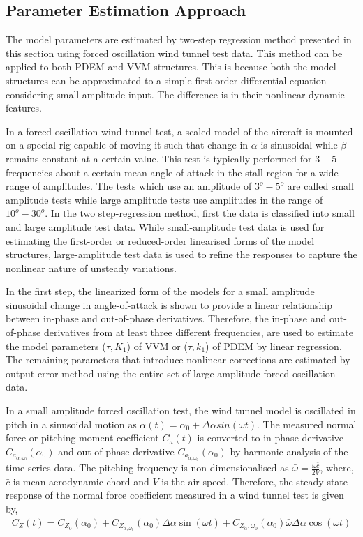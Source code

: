 \documentclass{AIAA}
\begin{document}
\subsection{Parameter Estimation Approach}
The model parameters are estimated by two-step regression method presented in this section using forced oscillation wind tunnel test data. This method can be applied to both PDEM and VVM structures. This is because both the model structures can be approximated to a simple first order differential equation considering small amplitude input. The difference is in their nonlinear dynamic features.

In a forced oscillation wind tunnel test, a scaled model of the aircraft is mounted on a special rig capable of moving it such that change in $\alpha$ is sinusoidal while $\beta$ remains constant at a certain value. This test is typically performed for $3-5$ frequencies about a certain mean angle-of-attack in the stall region for a wide range of amplitudes. The tests which use an amplitude of $3^o-5^o$ are called small amplitude tests while large amplitude tests use amplitudes in the range of $10^o-30^o$.  In the two step-regression method, first the data is classified into small and large amplitude test data. While small-amplitude test data is used for estimating the first-order or reduced-order linearised forms of the model structures, large-amplitude test data is used to refine the responses to capture the nonlinear nature of unsteady variations.

In the first step, the linearized form of the models for a small amplitude sinusoidal change in angle-of-attack is shown to provide a linear relationship between in-phase and out-of-phase derivatives. Therefore, the in-phase and out-of-phase derivatives from at least three different frequencies, are used to estimate the model parameters ($\tau, K_1$) of VVM or ($\tau, k_1$) of PDEM by linear regression. The remaining parameters that introduce nonlinear corrections are estimated by output-error method using the entire set of large amplitude forced oscillation data.

In a small amplitude forced oscillation test, the wind tunnel model is oscillated in pitch in a sinusoidal motion as $\alpha(t)= \alpha_0 + \Delta \alpha sin(\omega t)$. The measured normal force or pitching moment coefficient $C_a(t)$ is converted to in-phase derivative $C_{a_{\alpha,\omega_0}}(\alpha_0)$ and out-of-phase derivative $C_{a_{\dot{\alpha},\omega_0}}(\alpha_0)$ by harmonic analysis of the time-series data. The pitching frequency is non-dimensionalised as $ \bar{\omega}=\frac{\omega \bar{c}}{2 V}$, where, $\bar{c}$ is mean aerodynamic chord and $V$ is the air speed. Therefore, the steady-state response of the normal force coefficient measured in a wind tunnel test is given by,
\begin{eqnarray}
\label{Cztsmall}
C_Z(t) = C_{Z_0}(\alpha_0) + C_{Z_{\alpha,\omega_0}}(\alpha_0) \Delta \alpha \sin(\omega t) + C_{Z_{\dot{\alpha}},\omega_0}(\alpha_0) \bar{\omega}  \Delta \alpha \cos(\omega t)
\end{eqnarray}
\end{document}
